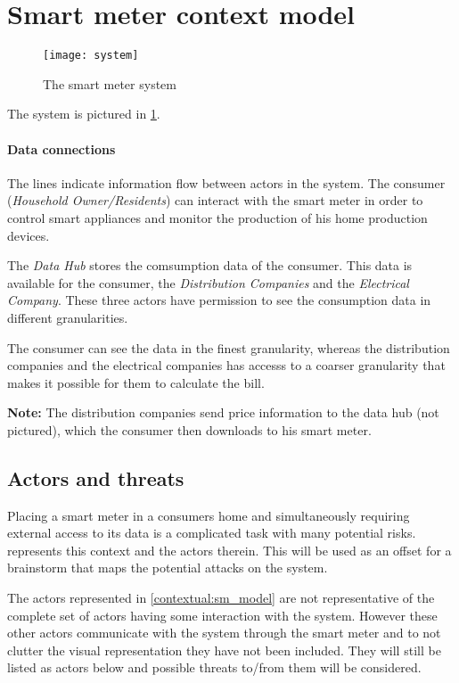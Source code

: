 \section{Smart meter context model}

\begin{figure}[h]
  \texttt{[image: system]}
  \caption{The smart meter system\cite{tdlm}}
  \label{contextual:system}
\end{figure}

The system is pictured in \cref{contextual:system}.

\paragraph{Data connections}
The lines indicate information flow between actors in the system.
The consumer (\textit{Household Owner/Residents}) can interact with the smart meter in order to control smart appliances and monitor the production of his home production devices.

The \textit{Data Hub} stores the comsumption data of the consumer.
This data is available for the consumer, the \textit{Distribution Companies} and the \textit{Electrical Company}.
These three actors have permission to see the consumption data in different granularities.

The consumer can see the data in the finest granularity, whereas the distribution companies and the electrical companies has accesss to a coarser granularity that makes it possible for them to calculate the bill.

\textbf{Note:} The distribution companies send price information to the data hub (not pictured), which the consumer then downloads to his smart meter.

\subsection{Actors and threats}
Placing a smart meter in a consumers home and simultaneously requiring external access to its data is a complicated task with many potential risks.
 represents this context and the actors therein.
This will be used as an offset for a brainstorm that maps the potential attacks on the system.

The actors represented in \cref{contextual:sm_model} are not representative of the complete set of actors having some interaction with the system.
However these other actors communicate with the system through the smart meter and to not clutter the visual representation they have not been included.
They will still be listed as actors below and possible threats to/from them will be considered.

